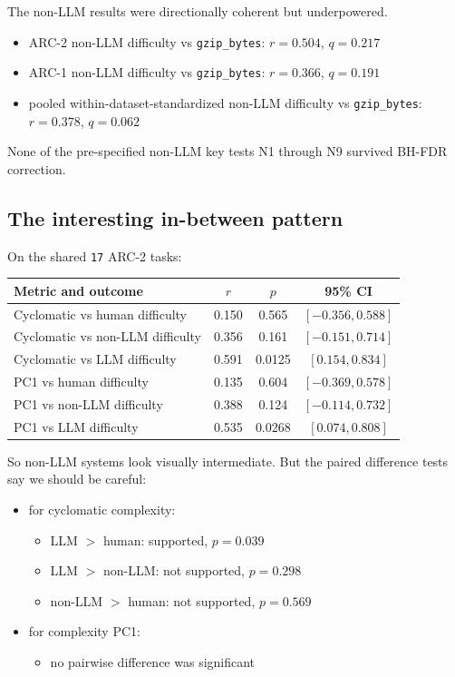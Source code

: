 \documentclass[11pt]{article}
\begin{document}
The non-LLM results were directionally coherent but underpowered.

\begin{itemize}
  \item ARC-2 non-LLM difficulty vs \texttt{gzip\_bytes}: $r = 0.504$, $q = 0.217$
  \item ARC-1 non-LLM difficulty vs \texttt{gzip\_bytes}: $r = 0.366$, $q = 0.191$
  \item pooled within-dataset-standardized non-LLM difficulty vs \texttt{gzip\_bytes}: $r = 0.378$, $q = 0.062$
\end{itemize}

None of the pre-specified non-LLM key tests N1 through N9 survived BH-FDR correction.

\subsection*{The interesting in-between pattern}

On the shared \texttt{17} ARC-2 tasks:

\begin{center}
\small
\begin{tabular}{p{2.4in}ccc}
\toprule
Metric and outcome & $r$ & $p$ & 95\% CI \\
\midrule
Cyclomatic vs human difficulty & 0.150 & 0.565 & $[-0.356, 0.588]$ \\
Cyclomatic vs non-LLM difficulty & 0.356 & 0.161 & $[-0.151, 0.714]$ \\
Cyclomatic vs LLM difficulty & 0.591 & 0.0125 & $[0.154, 0.834]$ \\
PC1 vs human difficulty & 0.135 & 0.604 & $[-0.369, 0.578]$ \\
PC1 vs non-LLM difficulty & 0.388 & 0.124 & $[-0.114, 0.732]$ \\
PC1 vs LLM difficulty & 0.535 & 0.0268 & $[0.074, 0.808]$ \\
\bottomrule
\end{tabular}
\end{center}

So non-LLM systems look visually intermediate. But the paired difference tests say we should be careful:

\begin{itemize}
  \item for cyclomatic complexity:
  \begin{itemize}
    \item LLM $>$ human: supported, $p = 0.039$
    \item LLM $>$ non-LLM: not supported, $p = 0.298$
    \item non-LLM $>$ human: not supported, $p = 0.569$
  \end{itemize}
  \item for complexity PC1:
  \begin{itemize}
    \item no pairwise difference was significant
  \end{itemize}
\end{itemize}
\end{document}
